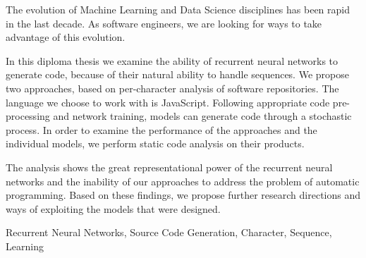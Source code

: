 \begin{abstracteng}
The evolution of Machine Learning and Data Science disciplines has been rapid in the last decade.
As software engineers, we are looking for ways to take advantage of this evolution.

In this diploma thesis we examine the ability of recurrent neural networks to generate code, because of their natural ability to handle sequences.
We propose two approaches, based on per-character analysis of software repositories. The language we choose to work with is JavaScript.
Following appropriate code pre-processing and network training, models can generate code through a stochastic process.
In order to examine the performance of the approaches and the individual models, we perform static code analysis on their products.

The analysis shows the great representational power of the recurrent neural networks and the inability of our approaches to address the problem of automatic programming. Based on these findings, we propose further research directions and ways of exploiting the models that were designed.

   \begin{keywordseng}
    Recurrent Neural Networks, Source Code Generation, Character, Sequence, Learning
   \end{keywordseng}

\end{abstracteng}
